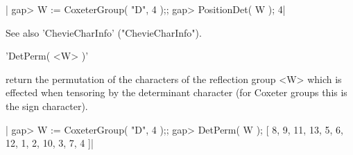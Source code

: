 |    gap> W := CoxeterGroup( "D", 4 );;
    gap> PositionDet( W );
    4|

See also 'ChevieCharInfo' ("ChevieCharInfo").


'DetPerm( <W> )'

return  the permutation of the characters of the reflection group <W> which
is effected when tensoring by the determinant character (for Coxeter groups
this is the sign character).

|    gap> W := CoxeterGroup( "D", 4 );;
    gap> DetPerm( W );
    [ 8, 9, 11, 13, 5, 6, 12, 1, 2, 10, 3, 7, 4 ]|

